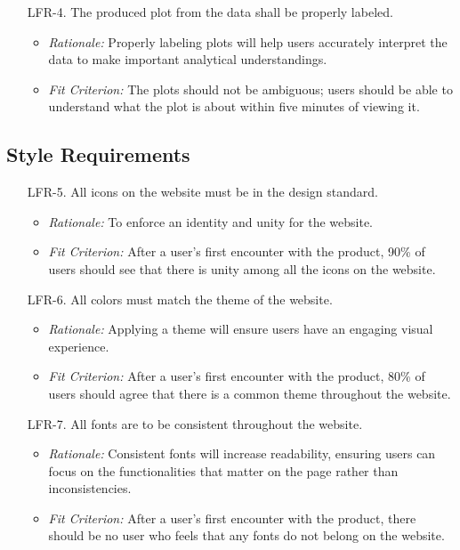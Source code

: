 \documentclass[12pt]{article}
\begin{document}
\begin{enumerate}
  \item[LFR-4.] The produced plot from the data shall be properly labeled.
  \begin{itemize}
    \item \textit{Rationale:} Properly labeling plots will help users
    accurately interpret the data to make important analytical understandings.
    \item \textit{Fit Criterion:} The plots should not be ambiguous; users
    should be able to understand what the plot is about within five minutes of
    viewing it.
  \end{itemize}
\end{enumerate}


\subsection{Style Requirements}
\begin{enumerate}
  \item[LFR-5.] All icons on the website must be in the design standard. 
  \begin{itemize}
    \item \textit{Rationale:} To enforce an identity and unity for the website. 
    \item \textit{Fit Criterion:} After a user's first encounter with the product, 90\% of users should
    see that there is unity among all the icons on the website. 
  \end{itemize}
  
  \item[LFR-6.] All colors must match the theme of the website.
  \begin{itemize}
    \item \textit{Rationale:} Applying a theme will ensure users have
    an engaging visual experience.
    \item \textit{Fit Criterion:} After a user's first encounter with the product, 80\% of users
    should agree that there is a common theme throughout the website.
  \end{itemize}
  
  \item[LFR-7.] All fonts are to be consistent throughout the website. 
  \begin{itemize}
    \item \textit{Rationale:} Consistent fonts will increase readability,
    ensuring users can focus on the functionalities that matter on the page rather than inconsistencies. 
    \item \textit{Fit Criterion:} After a user's first encounter with the product, there should
    be no user who feels that any fonts do not belong on the website. 
  \end{itemize}
\end{enumerate}
\end{document}
